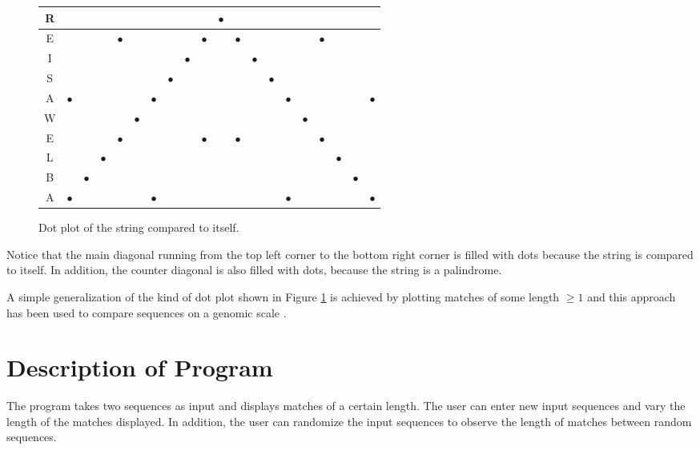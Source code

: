 \begin{figure}
\begin{center}
{\begin{tabular}{|c||c|c|c|c|c|c|c|c|c|c|c|c|c|c|c|c|c|c|c|}
\color{red}R & & & & & & & & & &\color{blue} $\bullet$ & & & & & & & & & \\\hline
\color{red}E & & & &\color{blue} $\bullet$ & & & & &\color{blue} $\bullet$ & &\color{blue} $\bullet$ & & & & &\color{blue} $\bullet$ & & & \\\hline
\color{red}I & & & & & & & &\color{blue} $\bullet$ & & & &\color{blue} $\bullet$ & & & & & & & \\\hline
\color{red}S & & & & & & &\color{blue} $\bullet$ & & & & & &\color{blue} $\bullet$ & & & & & & \\\hline
\color{red}A &\color{blue} $\bullet$ & & & & &\color{blue} $\bullet$ & & & & & & & &\color{blue} $\bullet$ & & & & &\color{blue}$\bullet$ \\\hline
\color{red}W & & & & &\color{blue} $\bullet$ & & & & & & & & & &\color{blue} $\bullet$ & & & & \\\hline
\color{red}E & & & &\color{blue} $\bullet$ & & & & &\color{blue} $\bullet$ & &\color{blue} $\bullet$ & & & & &\color{blue} $\bullet$ & & & \\\hline
\color{red}L & & &\color{blue} $\bullet$ & & & & & & & & & & & & & &\color{blue} $\bullet$ & & \\\hline
\color{red}B & &\color{blue} $\bullet$ & & & & & & & & & & & & & & & &\color{blue} $\bullet$ & \\\hline
\color{red}A &\color{blue} $\bullet$ & & & & &\color{blue} $\bullet$ & & & & & & & &\color{blue} $\bullet$ & & & & &\color{blue}$\bullet$ \\\hline
\end{tabular}}\end{center}
  \caption{Dot plot of the string  compared to
  itself.}
  \label{fig:dot}
\end{figure}

Notice that the main diagonal running from the top left corner to the
bottom right corner is filled with dots because the string is compared
to itself. In addition, the counter diagonal is also filled with dots,
because the string is a palindrome.

A simple generalization of the kind of dot plot shown in Figure
\ref{fig:dot} is achieved by plotting matches of some length $\ge 1$
and this approach has been used to compare sequences on a genomic
scale \cite{son96:dna}.

\section{Description of Program}
The program takes two sequences as input and displays matches of a
certain length. The user can enter new input sequences and vary the
length of the matches displayed. In addition, the user can randomize
the input sequences to observe the length of matches between random
sequences.

